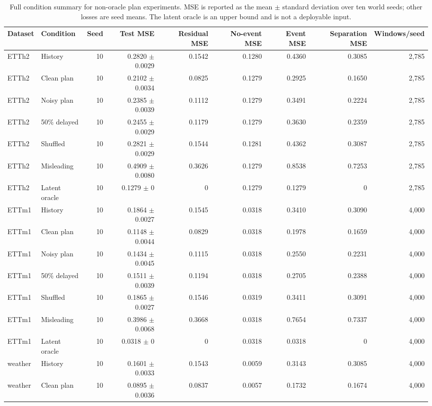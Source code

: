 
\begin{table}[t]
\centering
\caption{Full condition summary for non-oracle plan experiments. MSE is reported as the mean $\pm$ standard deviation over ten world seeds; other losses are seed means. The latent oracle is an upper bound and is not a deployable input.}
\label{tab:planned-all-conditions}
\scriptsize
\setlength{\tabcolsep}{3.2pt}
\begin{tabular}{@{}llrrrrrrr@{}}
\toprule
Dataset & Condition & Seed & Test MSE & Residual MSE & No-event MSE & Event MSE & Separation MSE & Windows/seed\\
\midrule
ETTh2 & History & 10 & 0.2820 $\pm$ 0.0029 & 0.1542 & 0.1280 & 0.4360 & 0.3085 & 2,785 \\
ETTh2 & Clean plan & 10 & 0.2102 $\pm$ 0.0034 & 0.0825 & 0.1279 & 0.2925 & 0.1650 & 2,785 \\
ETTh2 & Noisy plan & 10 & 0.2385 $\pm$ 0.0039 & 0.1112 & 0.1279 & 0.3491 & 0.2224 & 2,785 \\
ETTh2 & 50\% delayed & 10 & 0.2455 $\pm$ 0.0029 & 0.1179 & 0.1279 & 0.3630 & 0.2359 & 2,785 \\
ETTh2 & Shuffled & 10 & 0.2821 $\pm$ 0.0029 & 0.1544 & 0.1281 & 0.4362 & 0.3087 & 2,785 \\
ETTh2 & Misleading & 10 & 0.4909 $\pm$ 0.0080 & 0.3626 & 0.1279 & 0.8538 & 0.7253 & 2,785 \\
ETTh2 & Latent oracle & 10 & 0.1279 $\pm$ 0 & 0 & 0.1279 & 0.1279 & 0 & 2,785 \\
ETTm1 & History & 10 & 0.1864 $\pm$ 0.0027 & 0.1545 & 0.0318 & 0.3410 & 0.3090 & 4,000 \\
ETTm1 & Clean plan & 10 & 0.1148 $\pm$ 0.0044 & 0.0829 & 0.0318 & 0.1978 & 0.1659 & 4,000 \\
ETTm1 & Noisy plan & 10 & 0.1434 $\pm$ 0.0045 & 0.1115 & 0.0318 & 0.2550 & 0.2231 & 4,000 \\
ETTm1 & 50\% delayed & 10 & 0.1511 $\pm$ 0.0039 & 0.1194 & 0.0318 & 0.2705 & 0.2388 & 4,000 \\
ETTm1 & Shuffled & 10 & 0.1865 $\pm$ 0.0027 & 0.1546 & 0.0319 & 0.3411 & 0.3091 & 4,000 \\
ETTm1 & Misleading & 10 & 0.3986 $\pm$ 0.0068 & 0.3668 & 0.0318 & 0.7654 & 0.7337 & 4,000 \\
ETTm1 & Latent oracle & 10 & 0.0318 $\pm$ 0 & 0 & 0.0318 & 0.0318 & 0 & 4,000 \\
weather & History & 10 & 0.1601 $\pm$ 0.0033 & 0.1543 & 0.0059 & 0.3143 & 0.3085 & 4,000 \\
weather & Clean plan & 10 & 0.0895 $\pm$ 0.0036 & 0.0837 & 0.0057 & 0.1732 & 0.1674 & 4,000 \\

\end{tabular}
\end{table}
